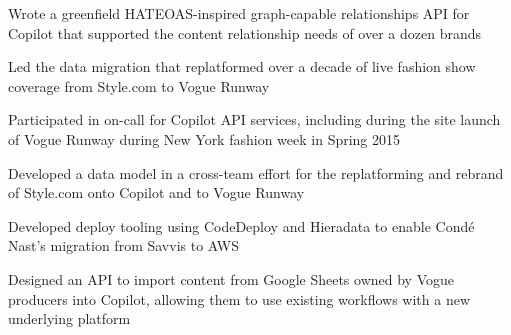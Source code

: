 \begin{job}

  \begin{accomplishments}
    \item Wrote a greenfield HATEOAS-inspired graph-capable relationships API
    for Copilot that supported the content relationship needs of over a dozen
    brands
    \item Led the data migration that replatformed over a decade of live fashion
    show coverage from Style.com to Vogue Runway
    \item Participated in on-call for Copilot API services, including during the
    site launch of Vogue Runway during New York fashion week in Spring 2015
  \end{accomplishments}
  \begin{extendedaccomplishments}
    \item Developed a data model in a cross-team effort for the replatforming
    and rebrand of Style.com onto Copilot and to Vogue Runway
    \item Developed deploy tooling using CodeDeploy and Hieradata to enable
    Cond\'{e} Nast's migration from Savvis to AWS
    \item Designed an API to import content from Google Sheets owned by Vogue
    producers into Copilot, allowing them to use existing workflows with a new
    underlying platform
  \end{extendedaccomplishments}
\end{job}
